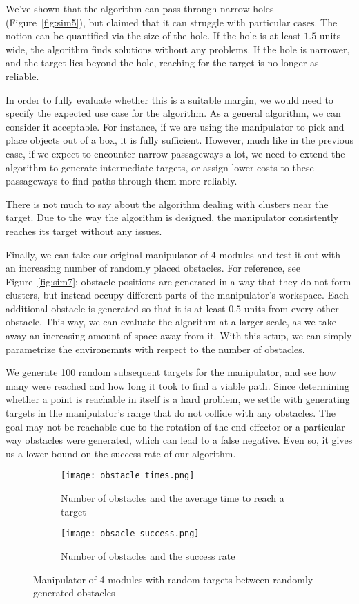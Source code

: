 We've shown that the algorithm can pass through narrow holes (Figure~\ref{fig:sim5}), but claimed that it can struggle with particular cases. The notion can be quantified via the size of the hole. If the hole is at least $1.5$ units wide, the algorithm finds solutions without any problems. If the hole is narrower, and the target lies beyond the hole, reaching for the target is no longer as reliable.

In order to fully evaluate whether this is a suitable margin, we would need to specify the expected use case for the algorithm. As a general algorithm, we can consider it acceptable. For instance, if we are using the manipulator to pick and place objects out of a box, it is fully sufficient.
However, much like in the previous case, if we expect to encounter narrow passageways a lot, we need to extend the algorithm to generate intermediate targets, or assign lower costs to these passageways to find paths through them more reliably.

There is not much to say about the algorithm dealing with clusters near the target. Due to the way the algorithm is designed, the manipulator consistently reaches its target without any issues.

Finally, we can take our original manipulator of 4 modules and test it out with an increasing number of randomly placed obstacles. For reference, see Figure~\ref{fig:sim7}: obstacle positions are generated in a way that they do not form clusters, but instead occupy different parts of the manipulator's workspace. Each additional obstacle is generated so that it is at least $0.5$ units from every other obstacle. This way, we can evaluate the algorithm at a larger scale, as we take away an increasing amount of space away from it. With this setup, we can simply parametrize the environemnts with respect to the number of obstacles.

We generate 100 random subsequent targets for the manipulator, and see how many were reached and how long it took to find a viable path. Since determining whether a point is reachable in itself is a hard problem, we settle with generating targets in the manipulator's range that do not collide with any obstacles. The goal may not be reachable due to the rotation of the end effector or a particular way obstacles were generated, which can lead to a false negative. Even so, it gives us a lower bound on the success rate of our algorithm.

\begin{figure}
  \centering
  \begin{subfigure}{.45\textwidth}
    \texttt{[image: obstacle\_times.png]}
    \caption{Number of obstacles and the average time to reach a target}
  \end{subfigure}
  \begin{subfigure}{0.45\textwidth}
    \texttt{[image: obsacle\_success.png]}
    \caption{Number of obstacles and the success rate}
  \end{subfigure}

  \caption{Manipulator of 4 modules with random targets between randomly generated obstacles}\label{fig:inc_obst}
\end{figure}

